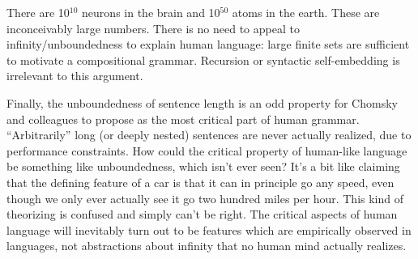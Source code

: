 \documentclass{article}
\begin{document}
There are 10$^{10}$ neurons in the brain and 10$^{50}$ atoms in the earth. These are inconceivably large numbers. There is no need to appeal to infinity\slash unboundedness to explain human language: large finite sets are sufficient to motivate a compositional grammar. Recursion or syntactic self-embedding is irrelevant to this argument.

Finally, the unboundedness of sentence length is an odd property for Chomsky and colleagues to propose as the most critical part of human grammar.  ``Arbitrarily'' long (or deeply nested) sentences are never actually realized, due to performance constraints. How could the critical property of human-like language be something like unboundedness, which isn’t ever seen? It's a bit like claiming that the defining feature of a car is that it can in principle go any speed, even though we only ever actually see it go two hundred miles per hour. This kind of theorizing is confused and simply can't be right. The critical aspects of human language will inevitably turn out to be features which are empirically observed in languages, not abstractions about infinity that no human mind actually realizes.

\printbibliography[heading=subbibliography,notkeyword=this]
\end{document}
